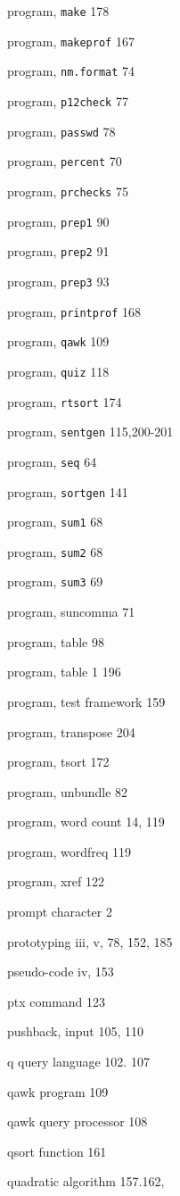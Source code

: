 \begin{multicols}{3}
program, \verb'make' 178

program, \verb'makeprof' 167

program, \verb'nm.format' 74

program, \verb'p12check' 77

program, \verb'passwd' 78

program, \verb'percent' 70

program, \verb'prchecks' 75

program, \verb'prep1' 90

program, \verb'prep2' 91

program, \verb'prep3' 93

program, \verb'printprof' 168

program, \verb'qawk' 109

program, \verb'quiz' 118

program, \verb'rtsort' 174

program, \verb'sentgen' 115,200-201

program, \verb'seq' 64

program, \verb'sortgen' 141

program, \verb'sum1' 68

program, \verb'sum2' 68

program, \verb'sum3' 69



program, suncomma 71

program, table 98

program, table 1 196

program, test framework 159

program, transpose 204

program, tsort 172

program, unbundle 82

program, word count 14, 119

program, wordfreq 119

program, xref 122

prompt character 2

prototyping iii, v, 78, 152, 185

pseudo-code iv, 153

ptx command 123

pushback, input 105, 110

q query language 102. 107

qawk program 109

qawk query processor 108

qsort function 161

quadratic algorithm 157.162,


\end{multicols}
